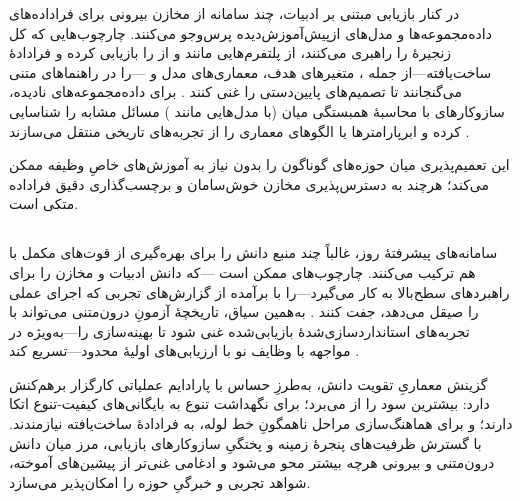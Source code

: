 در کنار بازیابی مبتنی بر ادبیات، چند سامانه از مخازن بیرونی برای فراداده‌های داده‌مجموعه‌ها و مدل‌های ازپیش‌آموزش‌دیده پرس‌وجو می‌کنند. چارچوب‌هایی که کل زنجیرهٔ  را راهبری می‌کنند،  از پلتفرم‌هایی مانند  و  از  را بازیابی کرده و فرادادهٔ ساخت‌یافته—از جمله ، متغیرهای هدف، معماری‌های مدل و —را در راهنماهای متنی می‌گنجانند تا تصمیم‌های پایین‌دستی را غنی کنند \cite{trirat2025automlagent, shen2023HuggingGPT}. برای داده‌مجموعه‌های نادیده، سازوکارهای  با محاسبهٔ همبستگی میان  (با مدل‌هایی مانند ) مسائل مشابه را شناسایی کرده و ابرپارامترها یا الگوهای معماری را از تجربه‌های تاریخی منتقل می‌سازند \cite{zhang2023AutomlGPTAutomaticMachineLearning}.

این  تعمیم‌پذیری میان حوزه‌های گوناگون را بدون نیاز به آموزش‌های خاصِ وظیفه ممکن می‌کند؛ هرچند به دسترس‌پذیری مخازن خوش‌سامان و برچسب‌گذاری دقیق فراداده متکی است.

\subsection[راهبردهای تقویتِ آمیخته]{}

سامانه‌های پیشرفتهٔ روز، غالباً چند منبع دانش را برای بهره‌گیری از قوت‌های مکمل با هم ترکیب می‌کنند. چارچوب‌های  ممکن است —که دانش ادبیات و مخازن را برای راهبردهای سطح‌بالا به کار می‌گیرد—را با  برآمده از گزارش‌های تجربی که اجرای عملی را صیقل می‌دهد، جفت کنند \cite{trirat2025automlagent, Yang2025NADER}. به‌همین سیاق، تاریخچهٔ آزمونِ درون‌متنی می‌تواند با تجربه‌های استانداردسازی‌شدهٔ بازیابی‌شده غنی شود تا  بهینه‌سازی را—به‌ویژه در مواجهه با وظایف نو با ارزیابی‌های اولیهٔ محدود—تسریع کند \cite{zhang-etal-2024-MLCopilot}.

گزینش معماریِ تقویت دانش، به‌طرزِ حساس با پارادایم عملیاتی کارگزار برهم‌کنش دارد:  بیشترین سود را از  می‌برد؛  برای نگهداشت تنوع به بایگانی‌های کیفیت-تنوع اتکا دارند؛ و  برای هماهنگ‌سازی مراحل ناهمگونِ خط لوله، به فرادادهٔ ساخت‌یافته نیازمندند. با گسترش ظرفیت‌های پنجرهٔ زمینه و پختگیِ سازوکارهای بازیابی، مرز میان دانش درون‌متنی و بیرونی هرچه بیشتر محو می‌شود و ادغامی غنی‌تر از پیشین‌های آموخته، شواهد تجربی و خبرگیِ حوزه را امکان‌پذیر می‌سازد.
